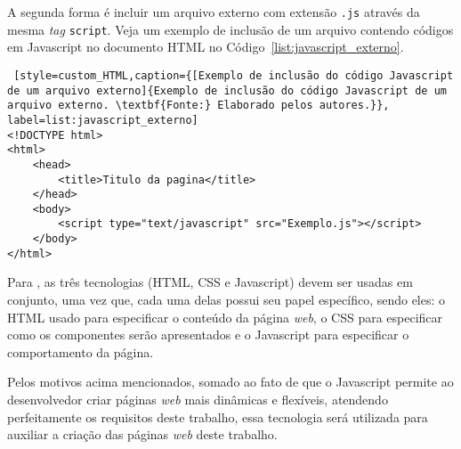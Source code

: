 
A segunda forma é incluir um arquivo externo com extensão \texttt{.js} através da mesma \textit{tag} \texttt{script}. Veja um exemplo de inclusão de um arquivo contendo códigos em Javascript no documento HTML no Código~\ref{list:javascript_externo}.

\begin{lstlisting} [style=custom_HTML,caption={[Exemplo de inclusão do código Javascript de um arquivo externo]{Exemplo de inclusão do código Javascript de um arquivo externo. \textbf{Fonte:} Elaborado pelos autores.}}, label=list:javascript_externo] 	
<!DOCTYPE html>
<html>
	<head>
		<title>Titulo da pagina</title>
	</head>
	<body>
		<script type="text/javascript" src="Exemplo.js"></script>
	</body>
</html>
\end{lstlisting}


Para , as três tecnologias (HTML, CSS e Javascript) devem ser usadas em conjunto, uma vez que, cada uma delas possui seu papel específico, sendo eles: o HTML usado para especificar o conteúdo da página \textit{web}, o CSS para especificar como os componentes serão apresentados e o Javascript para especificar o comportamento da página.

Pelos motivos acima mencionados, somado ao fato de que o Javascript permite ao desenvolvedor criar páginas \textit{web} mais dinâmicas e flexíveis, atendendo perfeitamente os requisitos deste trabalho, essa tecnologia será utilizada para auxiliar a criação das páginas \textit{web} deste trabalho.
